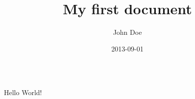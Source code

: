 \documentclass{article}
\title{My first document}
\date{2013-09-01}
\author{John Doe}
\begin{document}
\begin{verbatim}
\end{verbatim}

  \maketitle
  \newpage

  Hello World!

  \inputminted[linenos, breaklines, breakbytoken]{mysql}{../sql/db_schema_new.sql}
\end{document}
